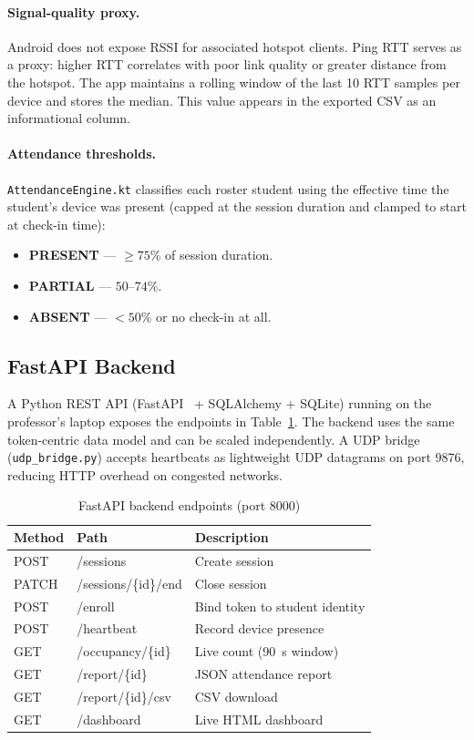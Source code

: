 \documentclass[sigconf,nonacm]{acmart}
\begin{document}
\paragraph{Signal-quality proxy.}
Android does not expose RSSI for associated hotspot clients.  Ping RTT
serves as a proxy: higher RTT correlates with poor link quality or
greater distance from the hotspot.  The app maintains a rolling window
of the last 10 RTT samples per device and stores the median.  This
value appears in the exported CSV as an informational column.

\paragraph{Attendance thresholds.}
\texttt{AttendanceEngine.kt} classifies each roster student using the
effective time the student's device was present (capped at the session
duration and clamped to start at check-in time):

\begin{itemize}
  \item \textbf{PRESENT} --- $\geq 75\%$ of session duration.
  \item \textbf{PARTIAL} --- $50\text{--}74\%$.
  \item \textbf{ABSENT} --- $< 50\%$ or no check-in at all.
\end{itemize}

\subsection{FastAPI Backend}

A Python REST API (FastAPI~\cite{fastapi} + SQLAlchemy + SQLite)
running on the professor's laptop exposes the endpoints in
Table~\ref{tab:backend-endpoints}.  The backend uses the same
token-centric data model and can be scaled independently.  A UDP
bridge (\texttt{udp\_bridge.py}) accepts heartbeats as lightweight UDP
datagrams on port 9876, reducing HTTP overhead on congested networks.

\begin{table}[h]
\caption{FastAPI backend endpoints (port 8000)}
\label{tab:backend-endpoints}
\begin{tabular}{lll}
\toprule
Method & Path & Description \\
\midrule
POST  & /sessions              & Create session \\
PATCH & /sessions/\{id\}/end   & Close session \\
POST  & /enroll                & Bind token to student identity \\
POST  & /heartbeat             & Record device presence \\
GET   & /occupancy/\{id\}      & Live count (90~s window) \\
GET   & /report/\{id\}         & JSON attendance report \\
GET   & /report/\{id\}/csv     & CSV download \\
GET   & /dashboard             & Live HTML dashboard \\
\bottomrule
\end{tabular}
\end{table}
\end{document}

